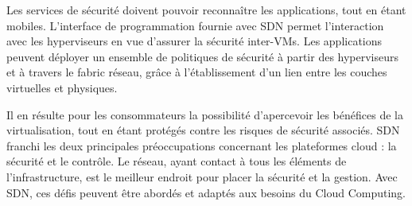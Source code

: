 Les services de sécurité doivent pouvoir reconnaître les applications, tout en étant mobiles. L'interface de programmation fournie avec SDN permet l'interaction avec les hyperviseurs en vue d'assurer la sécurité inter-VMs. Les applications peuvent déployer un ensemble de politiques de sécurité à partir des hyperviseurs et à travers le \gls{fabric} réseau, grâce à l'établissement d'un lien entre les couches virtuelles et physiques. 

Il en résulte pour les consommateurs la possibilité d'apercevoir les bénéfices de la virtualisation, tout en étant protégés contre les risques de sécurité associés. SDN franchi les deux principales préoccupations concernant les plateformes cloud : la sécurité et le contrôle. Le réseau, ayant contact à tous les éléments de l'infrastructure, est le meilleur endroit pour placer la sécurité et la gestion. Avec SDN, ces défis peuvent être abordés et adaptés aux besoins du Cloud Computing. \cite{cloudSecurityThreats} \cite{bigSwitchTapModernDC} \cite{zkCloudIntelligentNetwork}

